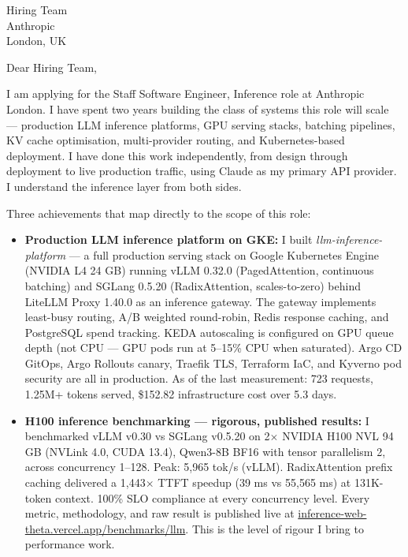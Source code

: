\documentclass[12pt,a4paper]{letter}
\date{\today}
\begin{document}
\begin{letter}{Hiring Team \\ Anthropic \\ London, UK}

\opening{Dear Hiring Team,}

I am applying for the Staff Software Engineer, Inference role at Anthropic London. I have spent two years building the class of systems this role will scale — production LLM inference platforms, GPU serving stacks, batching pipelines, KV cache optimisation, multi-provider routing, and Kubernetes-based deployment. I have done this work independently, from design through deployment to live production traffic, using Claude as my primary API provider. I understand the inference layer from both sides.

Three achievements that map directly to the scope of this role:

\begin{itemize}
  \item \textbf{Production LLM inference platform on GKE:} I built \textit{llm-inference-platform} — a full production serving stack on Google Kubernetes Engine (NVIDIA L4 24 GB) running vLLM 0.32.0 (PagedAttention, continuous batching) and SGLang 0.5.20 (RadixAttention, scales-to-zero) behind LiteLLM Proxy 1.40.0 as an inference gateway. The gateway implements least-busy routing, A/B weighted round-robin, Redis response caching, and PostgreSQL spend tracking. KEDA autoscaling is configured on GPU queue depth (not CPU — GPU pods run at 5--15\% CPU when saturated). Argo CD GitOps, Argo Rollouts canary, Traefik TLS, Terraform IaC, and Kyverno pod security are all in production. As of the last measurement: 723 requests, 1.25M+ tokens served, \$152.82 infrastructure cost over 5.3 days.

  \item \textbf{H100 inference benchmarking — rigorous, published results:} I benchmarked vLLM v0.30 vs SGLang v0.5.20 on 2$\times$ NVIDIA H100 NVL 94 GB (NVLink 4.0, CUDA 13.4), Qwen3-8B BF16 with tensor parallelism 2, across concurrency 1--128. Peak: 5,965 tok/s (vLLM). RadixAttention prefix caching delivered a 1,443$\times$ TTFT speedup (39 ms vs 55,565 ms) at 131K-token context. 100\% SLO compliance at every concurrency level. Every metric, methodology, and raw result is published live at \href{https://inference-web-theta.vercel.app/benchmarks/llm}{inference-web-theta.vercel.app/benchmarks/llm}. This is the level of rigour I bring to performance work.


\end{itemize}
\end{letter}
\end{document}
